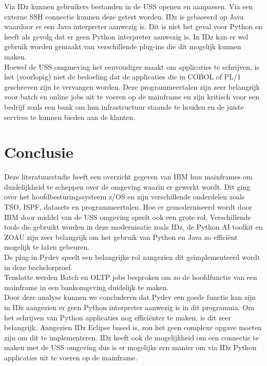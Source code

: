 Via IDz kunnen gebruikers bestanden in de USS openen en aanpassen. Via een externe SSH connectie kunnen deze getest worden. IDz is gebaseerd op Java waardoor er een Java interpreter aanwezig is. Dit is niet het geval voor Python en heeft als gevolg dat er geen Python interpreter aanwezig is. In IDz kan er wel gebruik worden gemaakt van verschillende plug-ins die dit mogelijk kunnen maken. \\

Hoewel de USS omgmeving het eenvoudiger maakt om applicaties te schrijven, is het (voorlopig) niet de bedoeling dat de applicaties die in COBOL of PL/1 geschreven zijn te vervangen worden. Deze programmeertalen zijn zeer belangrijk voor batch en online jobs uit te voeren op  de mainframe en zijn kritisch voor een bedrijf zoals een bank om hun infrastructuur staande te houden en de juiste services te kunnen bieden aan de klanten. 

\newpage
\section{Conclusie}
Deze literatuurstudie heeft een overzicht gegeven van IBM hun mainframes om duidelijkheid te scheppen over de omgeving waarin er gewerkt wordt. Dit ging over het hoofdbesturingssysteem z/OS en zijn verschillende onderdelen zoals TSO, ISPF, datasets en programmeertalen. Hoe er gemoderniseerd wordt door IBM door middel van de USS omgeving speelt ook een grote rol. Verschillende tools die gebruikt worden in deze modernisatie zoals IDz, de Python AI toolkit en ZOAU zijn zeer belangrijk om het gebruik van Python en Java zo efficiënt mogelijk te laten gebeuren. \\

De plug-in Pydev speelt een belangrijke rol aangezien dit geimplementeerd wordt in deze bachelorproef. \\

Tenslotte werden Batch en OLTP jobs besproken om zo de hoofdfunctie van een mainframe in een bankomgeving duidelijk te maken.\\

Door deze analyse kunnen we concluderen dat Pydev een goede functie kan zijn in IDz aangezien er geen Python interpreter aanwezig is in dit programma. Om het schrijven van Python applicaties nog efficiënter te maken, is dit zeer belangrijk. Aangezien IDz Eclipse based is, zou het geen complexe opgave moeten zijn om dit te implementeren. IDz heeft ook de mogelijkheid om een connectie te maken met de USS omgeving dus is er mogelijks een manier om via IDz Python applicaties uit te voeren op de mainframe. \\

